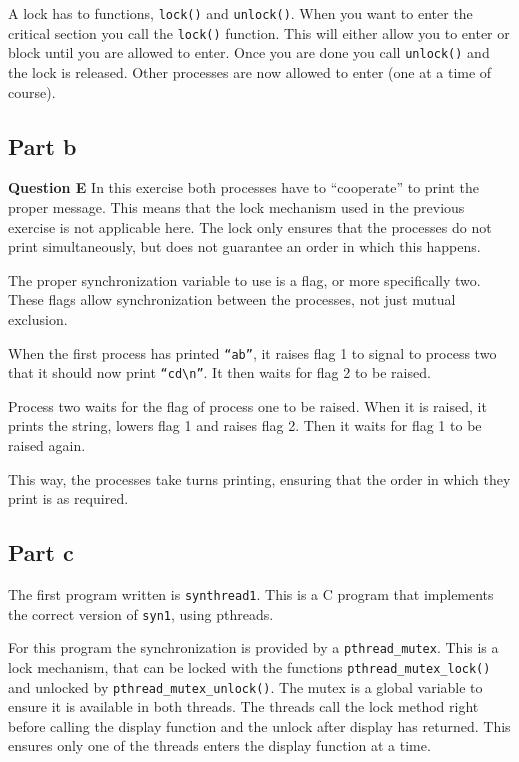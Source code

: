 \documentclass[a4paper]{article}
\begin{document}
A lock has to functions, \texttt{lock()} and \texttt{unlock()}. When you want to enter the
critical section you call the \texttt{lock()} function. This will either allow you to
enter or block until you are allowed to enter. Once you are done you call
\texttt{unlock()} and the lock is released. Other processes are now allowed to enter (one
at a time of course).

\subsection{Part b}
\textbf{Question E} In this exercise both processes have to ``cooperate'' to print the
proper message. This means that the lock mechanism used in the previous exercise is not
applicable here. The lock only ensures that the processes do not print simultaneously, but
does not guarantee an order in which this happens.

The proper synchronization variable to use is a flag, or more specifically two. These 
flags allow synchronization between the processes, not just mutual exclusion.

When the first process has printed \texttt{``ab''}, it raises flag 1 to signal to process
two that it should now print \texttt{``cd\textbackslash n''}. It then waits for flag 2 to
be raised.

Process two waits for the flag of process one to be raised. When it is raised, it prints
the string, lowers flag 1 and raises flag 2. Then it waits for flag 1 to be raised again.

This way, the processes take turns printing, ensuring that the order in which they print
is as required.

\subsection{Part c}

The first program written is \texttt{synthread1}. This is a C program that implements the
correct version of \texttt{syn1}, using pthreads.

For this program the synchronization is provided by a \texttt{pthread\_mutex}. This is a 
lock mechanism, that can be locked with the functions \texttt{pthread\_mutex\_lock()} and
unlocked by \texttt{pthread\_mutex\_unlock()}. The mutex is a global variable to ensure it 
is available in both threads. The threads call the lock method right before calling the
display function and the unlock after display has returned. This ensures only one of the
threads enters the display function at a time.
\end{document}
